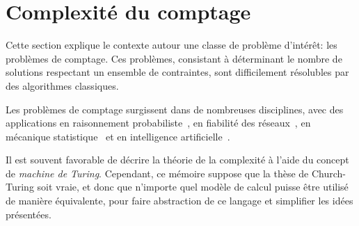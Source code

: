 \chapter{Complexité du comptage}
\label{cha:complexite-du-comptage}

Cette section explique le contexte autour une classe de problème d'intérêt: les problèmes de comptage. Ces problèmes, consistant à déterminant le nombre de solutions respectant un ensemble de contraintes, sont difficilement résolubles par des algorithmes classiques.

Les problèmes de comptage surgissent dans de nombreuses disciplines, avec des applications en raisonnement probabiliste~\cite{rothHardnessApproximateReasoning1996, sangPerformingBayesianInference2005, abramsonHailfinderBayesianSystem1996}, en fiabilité des réseaux~\cite{valiantComplexityEnumerationReliability1979, duenas-osorioCountingBasedReliabilityEstimation2017}, en mécanique statistique~\cite{jerrumPolynomialtimeApproximationAlgorithms1993} et en intelligence artificielle~\cite{balutaQuantitativeVerificationNeural2019}.

Il est souvent favorable de décrire la théorie de la complexité à l'aide du concept de \textit{machine de Turing}. Cependant, ce mémoire suppose que la thèse de Church-Turing soit vraie, et donc que n'importe quel modèle de calcul puisse être utilisé de manière équivalente, pour faire abstraction de ce langage et simplifier les idées présentées.

